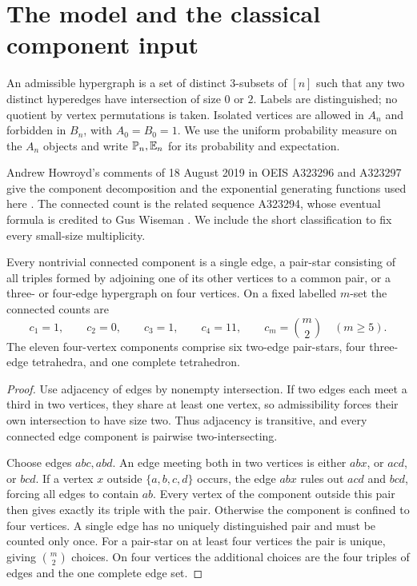 \section{The model and the classical component input}\label{sfh:sec:model}
An admissible hypergraph is a set of distinct $3$-subsets of $[n]$ such that any two distinct hyperedges have intersection of size $0$ or $2$. Labels are distinguished; no quotient by vertex permutations is taken. Isolated vertices are allowed in $A_n$ and forbidden in $B_n$, with $A_0=B_0=1$. We use the uniform probability measure on the $A_n$ objects and write $\mathbb P_n,\mathbb E_n$ for its probability and expectation.

Andrew Howroyd's comments of 18 August 2019 in OEIS A323296 and A323297 give the component decomposition and the exponential generating functions used here \cite{oeis296,oeis297}. The connected count is the related sequence A323294, whose eventual formula is credited to Gus Wiseman \cite{oeis294}. We include the short classification to fix every small-size multiplicity.

\begin{proposition}\label{sfh:prop:class}
Every nontrivial connected component is a single edge, a pair-star consisting of all triples formed by adjoining one of its other vertices to a common pair, or a three- or four-edge hypergraph on four vertices. On a fixed labelled $m$-set the connected counts are
\[
 c_1=1,\qquad c_2=0,\qquad c_3=1,\qquad c_4=11,\qquad
 c_m=\binom m2\quad(m\ge5).
\]
The eleven four-vertex components comprise six two-edge pair-stars, four three-edge tetrahedra, and one complete tetrahedron.
\end{proposition}
\begin{proof}
Use adjacency of edges by nonempty intersection. If two edges each meet a third in two vertices, they share at least one vertex, so admissibility forces their own intersection to have size two. Thus adjacency is transitive, and every connected edge component is pairwise two-intersecting.

Choose edges $abc,abd$. An edge meeting both in two vertices is either $abx$, or $acd$, or $bcd$. If a vertex $x$ outside $\{a,b,c,d\}$ occurs, the edge $abx$ rules out $acd$ and $bcd$, forcing all edges to contain $ab$. Every vertex of the component outside this pair then gives exactly its triple with the pair. Otherwise the component is confined to four vertices. A single edge has no uniquely distinguished pair and must be counted only once. For a pair-star on at least four vertices the pair is unique, giving $\binom m2$ choices. On four vertices the additional choices are the four triples of edges and the one complete edge set.
\end{proof}

